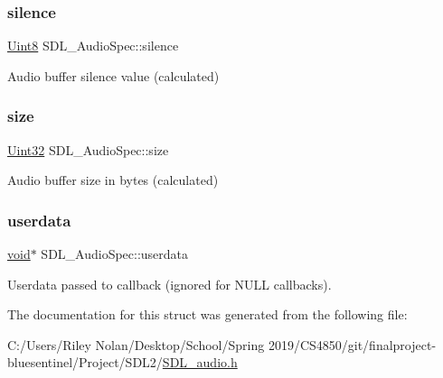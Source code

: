 \subsubsection{\texorpdfstring{silence}{silence}}
{\footnotesize\ttfamily \mbox{\hyperlink{_s_d_l__stdinc_8h_a2944638813a090aa23e62f4da842c3e2}{Uint8}} S\+D\+L\+\_\+\+Audio\+Spec\+::silence}

Audio buffer silence value (calculated) \mbox{\label{struct_s_d_l___audio_spec_a154cf44743ecec78c36dc6c827dd2fdb}} 
\subsubsection{\texorpdfstring{size}{size}}
{\footnotesize\ttfamily \mbox{\hyperlink{_s_d_l__stdinc_8h_add440eff171ea5f55cb00c4a9ab8672d}{Uint32}} S\+D\+L\+\_\+\+Audio\+Spec\+::size}

Audio buffer size in bytes (calculated) \mbox{\label{struct_s_d_l___audio_spec_aeec9481666f5f0982c98d3878f175d9b}} 
\subsubsection{\texorpdfstring{userdata}{userdata}}
{\footnotesize\ttfamily \mbox{\hyperlink{_s_d_l__opengles2__gl2ext_8h_ae5d8fa23ad07c48bb609509eae494c95}{void}}$\ast$ S\+D\+L\+\_\+\+Audio\+Spec\+::userdata}

Userdata passed to callback (ignored for N\+U\+LL callbacks). 

The documentation for this struct was generated from the following file\+:\begin{DoxyCompactItemize}
\item 
C\+:/\+Users/\+Riley Nolan/\+Desktop/\+School/\+Spring 2019/\+C\+S4850/git/finalproject-\/bluesentinel/\+Project/\+S\+D\+L2/\mbox{\hyperlink{_s_d_l__audio_8h}{S\+D\+L\+\_\+audio.\+h}}\end{DoxyCompactItemize}

